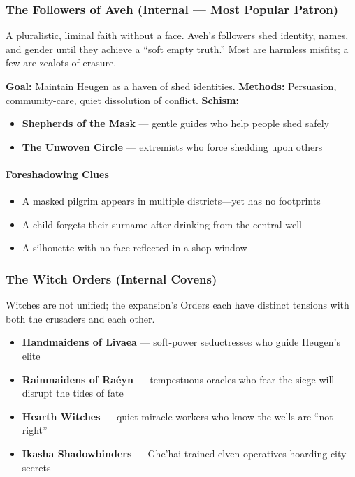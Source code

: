 \documentclass[11pt]{book}
\begin{document}
\subsubsection*{The Followers of Aveh (Internal --- Most Popular Patron)}

A pluralistic, liminal faith without a face. Aveh's followers shed identity,
names, and gender until they achieve a ``soft empty truth.'' Most are harmless
misfits; a few are zealots of erasure.

\textbf{Goal:} Maintain Heugen as a haven of shed identities.  
\textbf{Methods:} Persuasion, community-care, quiet dissolution of conflict.  
\textbf{Schism:}  
\begin{itemize}
    \item \textbf{Shepherds of the Mask} --- gentle guides who help people shed safely  
    \item \textbf{The Unwoven Circle} --- extremists who force shedding upon others
\end{itemize}

\paragraph{Foreshadowing Clues}
\begin{itemize}[leftmargin=*]
    \item A masked pilgrim appears in multiple districts---yet has no footprints  
    \item A child forgets their surname after drinking from the central well  
    \item A silhouette with no face reflected in a shop window
\end{itemize}

\subsubsection*{The Witch Orders (Internal Covens)}

Witches are not unified; the expansion's Orders each have distinct tensions 
with both the crusaders and each other.

\begin{itemize}[leftmargin=*]
    \item \textbf{Handmaidens of Livaea} --- soft-power seductresses who guide Heugen's elite
    \item \textbf{Rainmaidens of Raéyn} --- tempestuous oracles who fear the siege will disrupt the tides of fate
    \item \textbf{Hearth Witches} --- quiet miracle-workers who know the wells are ``not right''
    \item \textbf{Ikasha Shadowbinders} --- Ghe'hai-trained elven operatives hoarding city secrets
\end{itemize}
\end{document}
